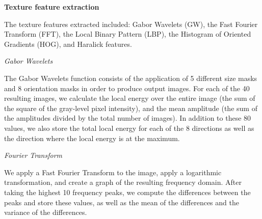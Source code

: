 \textbf{Texture feature extraction}


The texture features extracted included: Gabor Wavelets (GW), the Fast Fourier Transform (FFT), the Local Binary Pattern (LBP), the Histogram of Oriented Gradients (HOG), and Haralick features.

    \textit{Gabor Wavelets}

The Gabor Wavelets function consists of the application of 5 different size masks and 8 orientation masks in order to produce output images. For each of the 40 resulting images, we calculate the local energy over the entire image (the sum of the square of the gray-level pixel intensity), and the mean amplitude (the sum of the amplitudes divided by the total number of images). In addition to these 80 values, we also store the total local energy for each of the 8 directions as well as the direction where the local energy is at the maximum.

    \textit{Fourier Transform}

We apply a Fast Fourier Transform to the image, apply a logarithmic transformation, and create a graph of the resulting frequency domain. After taking the highest 10 frequency peaks, we compute the differences between the peaks and store these values, as well as the mean of the differences and the variance of the differences. 

    
    
    
    
    
  
  
  